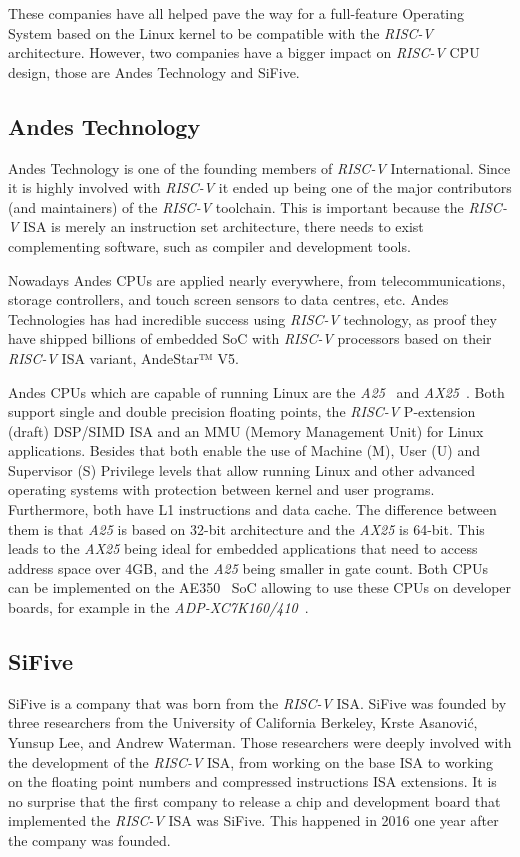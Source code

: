 These companies have all helped pave the way for a full-feature Operating System based on the Linux kernel to be compatible with the \textit{RISC-V} architecture. However, two companies have a bigger impact on \textit{RISC-V} CPU design, those are Andes Technology and SiFive.

\subsection{Andes Technology}
Andes Technology is one of the founding members of \textit{RISC-V} International. Since it is highly involved with \textit{RISC-V} it ended up being one of the major contributors (and maintainers) of the \textit{RISC-V} toolchain. This is important because the \textit{RISC-V} ISA is merely an instruction set architecture, there needs to exist complementing software, such as compiler and development tools.

Nowadays Andes CPUs are applied nearly everywhere, from telecommunications, storage controllers, and touch screen sensors to data centres, etc. Andes Technologies has had incredible success using \textit{RISC-V} technology, as proof they have shipped billions of embedded SoC with \textit{RISC-V} processors based on their \textit{RISC-V} ISA variant, AndeStar™ V5.

Andes CPUs which are capable of running Linux are the \textit{A25}~\cite{a25} and \textit{AX25}~\cite{ax25}. Both support single and double precision floating points, the \textit{RISC-V} P-extension (draft) DSP/SIMD ISA and an MMU (Memory Management Unit) for Linux applications. Besides that both enable the use of Machine (M), User (U) and Supervisor (S) Privilege levels that allow running Linux and other advanced operating systems with protection between kernel and user programs. Furthermore, both have L1 instructions and data cache. The difference between them is that \textit{A25} is based on 32-bit architecture and the \textit{AX25} is 64-bit. This leads to the \textit{AX25} being ideal for embedded applications that need to access address space over 4GB, and the \textit{A25} being smaller in gate count. Both CPUs can be implemented on the AE350~\cite{ae350} SoC allowing to use these CPUs on developer boards, for example in the \textit{ADP-XC7K160/410}~\cite{adp-xc7k160}.

\subsection{SiFive}
SiFive is a company that was born from the \textit{RISC-V} ISA. SiFive was founded by three researchers from the University of California Berkeley, Krste Asanović, Yunsup Lee, and Andrew Waterman. Those researchers were deeply involved with the development of the \textit{RISC-V} ISA, from working on the base ISA to working on the floating point numbers and compressed instructions ISA extensions. It is no surprise that the first company to release a chip and development board that implemented the \textit{RISC-V} ISA was SiFive. This happened in 2016 one year after the company was founded.

